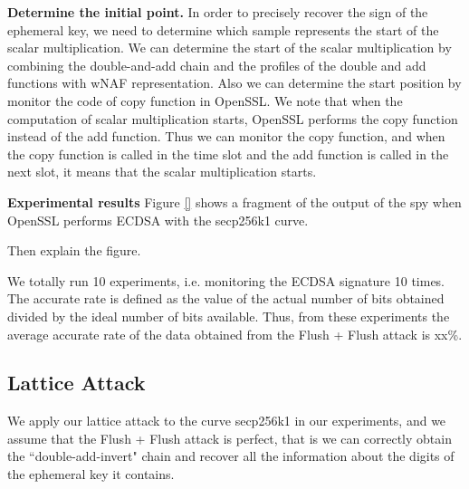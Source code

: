 \noindent\textbf{Determine the initial point.}
In order to precisely recover the sign of the ephemeral key, we need to determine which sample represents the start of the scalar multiplication.
We can determine the
start of the scalar multiplication
by combining the double-and-add chain and the profiles of the double and add functions with wNAF representation.
Also we can determine the start position by monitor the code of copy function in OpenSSL.
 We note that when the computation of scalar multiplication starts, OpenSSL performs the copy function instead of the add function.
 Thus we can monitor the copy function, and when the copy function is called in the time slot and the add function is called in the next slot, it means that the scalar multiplication starts.


\noindent\textbf{Experimental results}
Figure \ref{} shows a fragment of the output of the spy when OpenSSL performs ECDSA with the secp256k1 curve.

Then explain the figure.

We totally run 10 experiments, i.e. monitoring the ECDSA signature 10 times.
The accurate rate is defined as the value of the actual number of bits obtained divided by the ideal number of bits available.
Thus, from these experiments the average accurate rate of the data obtained from the Flush + Flush attack is xx\%.



%
%
%
%
%


\subsection{Lattice Attack}
\label{latticeattack}
We apply our lattice attack to the curve secp256k1 in our experiments, and we assume that the Flush + Flush attack is perfect, that is we can correctly obtain the ``double-add-invert" chain and recover all the information about the digits of the ephemeral key it contains.


